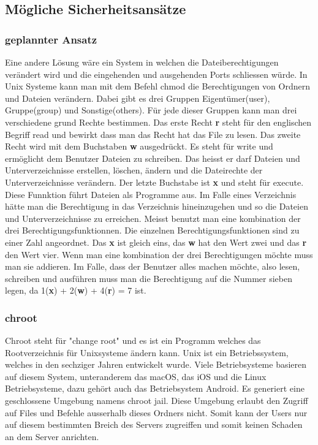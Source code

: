 \documentclass[10pt]{article}
\begin{document}
	\subsection{Mögliche Sicherheitsansätze}
	
		\subsubsection{geplannter Ansatz}
	Eine andere Lösung wäre ein System in welchen die Dateiberechtigungen verändert wird und die eingehenden und ausgehenden Ports schliessen würde. In Unix Systeme kann man mit dem Befehl chmod die Berechtigungen von Ordnern und Dateien verändern. Dabei gibt es drei Gruppen Eigentümer(user), Gruppe(group) und Sonstige(others). Für jede dieser Gruppen kann man drei verschiedene grund Rechte bestimmen. Das erste Recht \textbf{r} steht für den englischen Begriff read und bewirkt dass man das Recht hat das File zu lesen. Das zweite Recht wird mit dem Buchstaben \textbf{w} ausgedrückt. Es steht für write und ermöglicht dem Benutzer Dateien zu schreiben. Das heisst er darf Dateien und Unterverzeichnisse erstellen, löschen, ändern und die Dateirechte der Unterverzeichnisse verändern. Der letzte Buchstabe ist \textbf{x} und steht für execute. Diese Funnktion führt Dateien als Programme aus. Im Falle eines Verzeichnis hätte man die Berechtigung in das Verzeichnis hineinzugehen und so die Dateien und Unterverzeichnisse zu erreichen. Meisst benutzt man eine kombination der drei Berechtigungsfunktionnen. Die einzelnen Berechtigungsfunktionen sind zu einer Zahl angeordnet. Das \textbf{x} ist gleich eins, das \textbf{w} hat den Wert zwei und das \textbf{r} den Wert vier. Wenn man eine kombination der drei Berechtigungen möchte muss man sie addieren. Im Falle, dass der  Benutzer alles machen möchte, also lesen, schreiben und ausführen muss man die Berechtigung auf die Nummer sieben legen, da 1(\textbf{x}) + 2(\textbf{w}) + 4(\textbf{r}) = 7 ist. 
	
	\subsubsection{chroot}
	
	Chroot steht für "change root" und es ist ein Programm welches das Rootverzeichnis für Unixsysteme ändern kann.\cite{07} Unix ist ein Betriebssystem, welches in den sechziger Jahren entwickelt wurde. Viele Betriebsysteme basieren auf diesem System, unteranderem das macOS, das iOS und die Linux Betriebsysteme, dazu gehört auch das Betriebsystem Android.\cite{08} Es generiert eine geschlossene Umgebung namens chroot jail. Diese Umgebung erlaubt den Zugriff auf  Files und Befehle ausserhalb dieses Ordners nicht. Somit kann der Users nur auf diesem bestimmten Breich des Servers zugreiffen und somit keinen Schaden an dem Server anrichten.\cite{09}	
	
\end{document}
